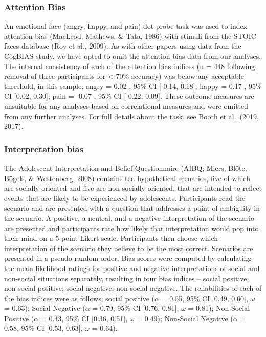 \documentclass[man,floatsintext]{apa6}
\begin{document}
\hypertarget{attention-bias}{%
\subsubsection{Attention Bias}\label{attention-bias}}

An emotional face (angry, happy, and pain) dot-probe task was used to index attention bias (MacLeod, Mathews, \& Tata, 1986) with stimuli from the STOIC faces database (Roy et al., 2009). As with other papers using data from the CogBIAS study, we have opted to omit the attention bias data from our analyses. The internal consistency of each of the attention bias indices (n = 448 following removal of three participants for \textless{} 70\% accuracy) was below any acceptable threshold, in this sample; angry = 0.02 , 95\% CI {[}-0.14, 0.18{]}; happy = 0.17 , 95\% CI {[}0.02, 0.30{]}; pain = -0.07 , 95\% CI {[}-0.22, 0.09{]}. These outcome measures are unsuitable for any analyses based on correlational measures and were omitted from any further analyses. For full details about the task, see Booth et al.~(2019, 2017).

\hypertarget{interpretation-bias}{%
\subsubsection{Interpretation bias}\label{interpretation-bias}}

The Adolescent Interpretation and Belief Questionnaire (AIBQ; Miers, Blöte, Bögels, \& Westenberg, 2008) contains ten hypothetical scenarios, five of which are socially oriented and five are non-socially oriented, that are intended to reflect events that are likely to be experienced by adolescents. Participants read the scenario and are presented with a question that addresses a point of ambiguity in the scenario. A positive, a neutral, and a negative interpretation of the scenario are presented and participants rate how likely that interpretation would pop into their mind on a 5-point Likert scale. Participants then choose which interpretation of the scenario they believe to be the most correct. Scenarios are presented in a pseudo-random order. Bias scores were computed by calculating the mean likelihood ratings for positive and negative interpretations of social and non-social situations separately, resulting in four bias indices -- social positive; non-social positive; social negative; non-social negative. The reliabilities of each of the bias indices were as follows; social positive (\(\alpha\) = 0.55, 95\% CI {[}0.49, 0.60{]}, \(\omega\) = 0.63); Social Negative (\(\alpha\) = 0.79, 95\% CI {[}0.76, 0.81{]}, \(\omega\) = 0.81); Non-Social Positive (\(\alpha\) = 0.43, 95\% CI {[}0.36, 0.51{]}, \(\omega\) = 0.49); Non-Social Negative (\(\alpha\) = 0.58, 95\% CI {[}0.53, 0.63{]}, \(\omega\) = 0.64).
\end{document}
